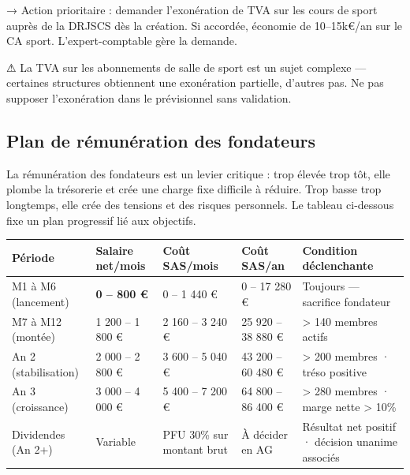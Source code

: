 \documentclass[11pt, a4paper]{article}
\newcommand{\redcell}[1]{\textcolor{fc-red}{\textbf{#1}}}
\begin{document}
\begin{tipbox}
→ Action prioritaire : demander l'exonération de TVA sur les cours de sport auprès de la DRJSCS dès la création. Si accordée, économie de 10–15k€/an sur le CA sport. L'expert-comptable gère la demande.
\end{tipbox}

\begin{warnbox}
⚠ La TVA sur les abonnements de salle de sport est un sujet complexe — certaines structures obtiennent une exonération partielle, d'autres pas. Ne pas supposer l'exonération dans le prévisionnel sans validation.
\end{warnbox}

\subsection{Plan de rémunération des fondateurs}

La rémunération des fondateurs est un levier critique : trop élevée trop tôt, elle plombe la trésorerie et crée une charge fixe difficile à réduire. Trop basse trop longtemps, elle crée des tensions et des risques personnels. Le tableau ci-dessous fixe un plan progressif lié aux objectifs.

\begin{center}
\begin{tabular}{@{}p{3.2cm}p{2.4cm}p{2.4cm}p{2.8cm}p{3.2cm}@{}}
\toprule
\rowcolor{fc-ink}\color{white}\textbf{Période} & \color{white}\textbf{Salaire net/mois} & \color{white}\textbf{Coût SAS/mois} & \color{white}\textbf{Coût SAS/an} & \color{white}\textbf{Condition déclenchante} \\
\midrule
M1 à M6 (lancement) & \redcell{0 – 800 €} & 0 – 1 440 € & 0 – 17 280 € & Toujours — sacrifice fondateur \\
\rowcolor{fc-bg2} M7 à M12 (montée) & 1 200 – 1 800 € & 2 160 – 3 240 € & 25 920 – 38 880 € & > 140 membres actifs \\
An 2 (stabilisation) & 2 000 – 2 800 € & 3 600 – 5 040 € & 43 200 – 60 480 € & > 200 membres · tréso positive \\
\rowcolor{fc-bg2} An 3 (croissance) & 3 000 – 4 000 € & 5 400 – 7 200 € & 64 800 – 86 400 € & > 280 membres · marge nette > 10\% \\
Dividendes (An 2+) & Variable & PFU 30\% sur montant brut & À décider en AG & Résultat net positif · décision unanime associés \\
\bottomrule
\end{tabular}
\end{center}
\end{document}
